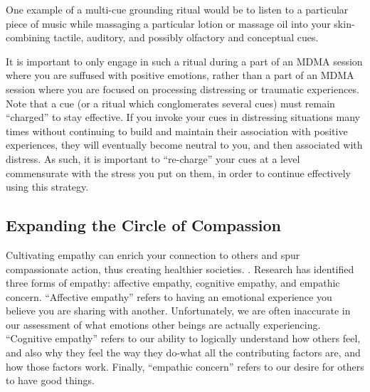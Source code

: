 \documentclass[12pt,letterpaper]{article}
\begin{document}
One example of a multi-cue grounding ritual would be to listen to a particular piece of music while massaging a particular lotion or massage oil into your skin-combining tactile, auditory, and possibly olfactory and conceptual cues.

It is important to only engage in such a ritual during a part of an MDMA session where you are suffused with positive emotions, rather than a part of an MDMA session where you are focused on processing distressing or traumatic experiences. Note that a cue (or a ritual which conglomerates several cues) must remain “charged” to stay effective. If you invoke your cues in distressing situations many times without continuing to build and maintain their association with positive experiences, they will eventually become neutral to you, and then associated with distress. As such, it is important to “re-charge” your cues at a level commensurate with the stress you put on them, in order to continue effectively using this strategy.
\subsection{Expanding the Circle of Compassion}
Cultivating empathy can enrich your connection to others and spur compassionate action, thus creating healthier societies. . Research has identified three forms of empathy: affective empathy, cognitive empathy, and empathic concern. “Affective empathy” refers to having an emotional experience you believe you are sharing with another. Unfortunately, we are often inaccurate in our assessment of what emotions other beings are actually experiencing. “Cognitive empathy” refers to our ability to logically understand how others feel, and also why they feel the way they do-what all the contributing factors are, and how those factors work. Finally, “empathic concern” refers to our desire for others to have good things.
\end{document}

